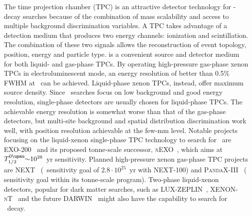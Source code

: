 \begin{description}[wide]
  \item[Time Projection Chambers] The time projection chamber (TPC) is an attractive
    detector technology for \onbb-decay searches because of the combination of mass
    scalability and access to multiple background discrimination variables. A TPC takes
    advantage of a detection medium that produces two energy channels: ionization and
    scintillation. The combination of these two signals allows the reconstruction of event
    topology, position, energy and particle type.  is a convenient source and
    detector medium for both liquid- and gas-phase TPCs. By operating high-pressure
    gas-phase xenon TPCs in electroluminescent mode, an energy resolution of better than
    0.5\% FWHM at \qbb\ can be achieved. Liquid-phase xenon TPCs, instead, offer maximum
    source density. Since \onbb\ searches focus on low background and good energy
    resolution, single-phase detectors are usually chosen for liquid-phase TPCs. The
    achievable energy resolution is somewhat worse than that of the gas-phase detectors,
    but multi-site background and spatial distribution discrimination work well, with
    position resolution achievable at the few-mm level. Notable projects focusing on the
    liquid-xenon single-phase TPC technology to search for \onbb\ are
    EXO-200~\cite{Auger2012} and its proposed tonne-scale successor,
    \textsc{nEXO}~\cite{Kharusi2018}, which aims at $\thalfzeroM {\sim}10^{28}$~yr
    sensitivity.  Planned high-pressure xenon gas-phase TPC projects are
    NEXT~\cite{Lopez-March2017} (\thalfzero\ sensitivity goal of $2.8 \cdot 10^{25}$~yr with
    NEXT-100) and \textsc{PandaX-III}~\cite{Chen2016} ( sensitivity goal
    within its tonne-scale program). Two-phase liquid-xenon detectors, popular for dark
    matter searches, such as LUX-ZEPLIN~\cite{Akerib2015},
    \textsc{XENON-nT}~\cite{Aprile2017} and the future DARWIN~\cite{Aalbers2016} might
    also have the capability to search for \onbb\ decay.


\end{description}
